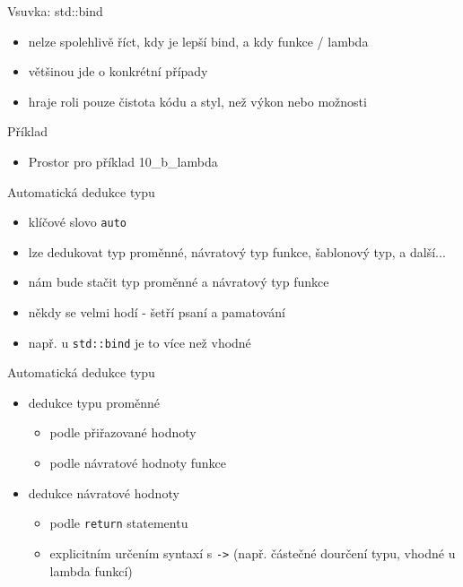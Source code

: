 \documentclass{beamer}
\begin{document}
\begin{xframe}{Vsuvka: std::bind}
	\begin{itemize}
		\item nelze spolehlivě říct, kdy je lepší bind, a kdy funkce / lambda
		\item většinou jde o konkrétní případy
		\item hraje roli pouze čistota kódu a styl, než výkon nebo možnosti
	\end{itemize}
\end{xframe}

\begin{xframe}{Příklad}
	\begin{itemize}
		\item Prostor pro příklad 10\_b\_lambda
	\end{itemize}
\end{xframe}

\begin{xframe}{Automatická dedukce typu}
	\begin{itemize}
		\item klíčové slovo \texttt{auto}
		\item lze dedukovat typ proměnné, návratový typ funkce, šablonový typ, a další...
		\item nám bude stačit typ proměnné a návratový typ funkce
		\item někdy se velmi hodí - šetří psaní a pamatování
		\item např. u \texttt{std::bind} je to více než vhodné
	\end{itemize}
\end{xframe}

\begin{xframe}{Automatická dedukce typu}
	\begin{itemize}
		\item dedukce typu proměnné
			\begin{itemize}
				\item podle přiřazované hodnoty
				\item podle návratové hodnoty funkce
			\end{itemize}
		\item dedukce návratové hodnoty
			\begin{itemize}
				\item podle \texttt{return} statementu
				\item explicitním určením syntaxí s \texttt{->} (např. částečné dourčení typu, vhodné u lambda funkcí)
			\end{itemize}
	\end{itemize}
\end{xframe}
\end{document}
